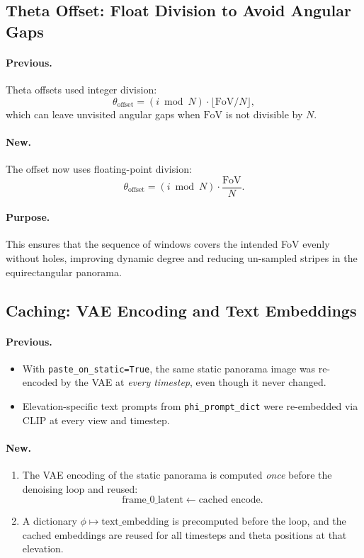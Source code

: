 \documentclass[11pt,a4paper]{article}
\newcommand{\fn}[1]{\texttt{#1}}
\begin{document}
\subsection{Theta Offset: Float Division to Avoid Angular Gaps}

\paragraph{Previous.}
Theta offsets used integer division:
\begin{equation}
    \theta_\text{offset} = (i \bmod N)\cdot \bigl\lfloor\text{FoV}/N\bigr\rfloor,
\end{equation}
which can leave unvisited angular gaps when \(\text{FoV}\) is not divisible by \(N\).

\paragraph{New.}
The offset now uses floating-point division:
\begin{equation}
    \theta_\text{offset} = (i \bmod N)\cdot \frac{\text{FoV}}{N}.
\end{equation}

\paragraph{Purpose.}
This ensures that the sequence of windows covers the intended FoV evenly without holes,
improving dynamic degree and reducing un-sampled stripes in the equirectangular panorama.

\subsection{Caching: VAE Encoding and Text Embeddings}

\paragraph{Previous.}
\begin{itemize}
    \item With \fn{paste\_on\_static=True}, the same static panorama image was re-encoded by the VAE at \emph{every timestep}, even though it never changed.
    \item Elevation-specific text prompts from \fn{phi\_prompt\_dict} were re-embedded via CLIP at every view and timestep.
\end{itemize}

\paragraph{New.}
\begin{enumerate}
    \item The VAE encoding of the static panorama is computed \emph{once} before the denoising loop and reused:
    \[
        \text{frame\_0\_latent} \leftarrow \text{cached encode}.
    \]
    \item A dictionary \(\phi\mapsto \text{text\_embedding}\) is precomputed before the loop, and the cached embeddings are reused for all timesteps and theta positions at that elevation.
\end{enumerate}
\end{document}
